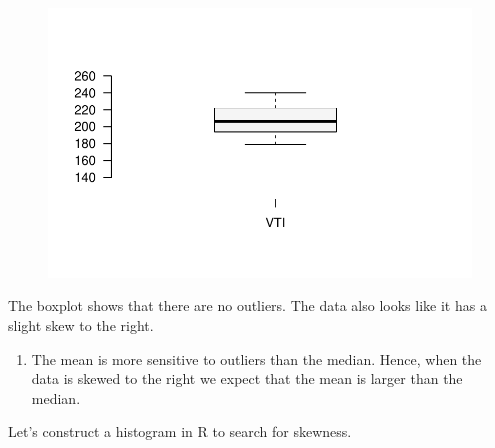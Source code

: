 \documentclass[
  letterpaper,
  DIV=11,
  numbers=noendperiod]{scrreprt}
\providecommand{\tightlist}{%
  \setlength{\itemsep}{0pt}\setlength{\parskip}{0pt}}\usepackage{longtable,booktabs,array}
\begin{document}
\begin{figure}[H]

{\centering \includegraphics{./06-DescriptiveV_files/figure-pdf/unnamed-chunk-5-1.pdf}

}

\end{figure}

The boxplot shows that there are no outliers. The data also looks like
it has a slight skew to the right.

\begin{blackbox}

\begin{enumerate}
\def\labelenumi{\arabic{enumi}.}
\setcounter{enumi}{1}
\tightlist
\item
  The mean is more sensitive to outliers than the median. Hence, when
  the data is skewed to the right we expect that the mean is larger than
  the median.
\end{enumerate}

\end{blackbox}

Let's construct a histogram in R to search for skewness.
\end{document}
